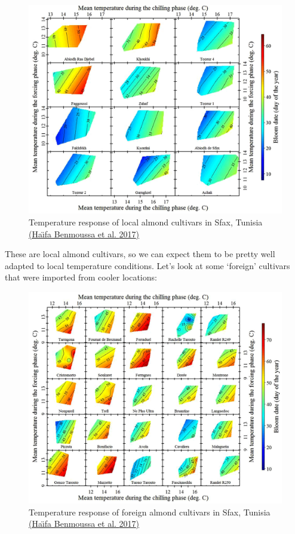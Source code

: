 \documentclass[
]{book}
\begin{document}
\begin{figure}
\centering
\includegraphics{pictures/rainbow_local_almonds.jpg}
\caption{Temperature response of local almond cultivars in Sfax, Tunisia \href{https://doi.org/10.1016/j.agrformet.2017.02.030}{(Haı̈fa Benmoussa et al. \protect\hyperlink{ref-benmoussa2017chilling}{2017})}}
\end{figure}

These are local almond cultivars, so we can expect them to be pretty well adapted to local temperature conditions. Let's look at some `foreign' cultivars that were imported from cooler locations:

\begin{figure}
\centering
\includegraphics{pictures/rainbow_foreign_almonds.jpg}
\caption{Temperature response of foreign almond cultivars in Sfax, Tunisia \href{https://doi.org/10.1016/j.agrformet.2017.02.030}{(Haı̈fa Benmoussa et al. \protect\hyperlink{ref-benmoussa2017chilling}{2017})}}
\end{figure}
\end{document}
